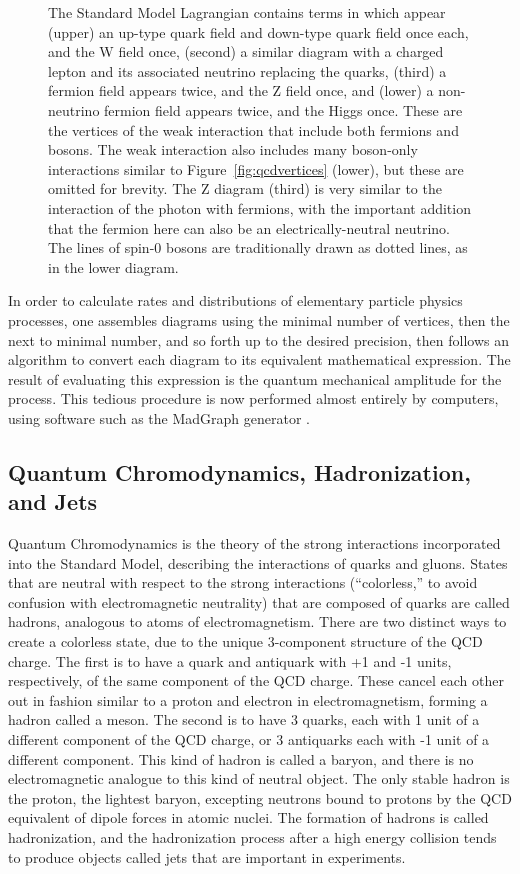 \begin{figure}[h!]
    \caption[The vertices of QCD.]{
      The Standard Model Lagrangian contains terms in which appear (upper) an up-type quark field and down-type quark field once each, and the W field once, (second) a similar diagram with a charged lepton and its associated neutrino replacing the quarks, (third) a fermion field appears twice, and the Z field once, and (lower) a non-neutrino fermion field appears twice, and the Higgs once.
      These are the vertices of the weak interaction that include both fermions and bosons.      
      The weak interaction also includes many boson-only interactions similar to Figure~\ref{fig:qcdvertices} (lower), but these are omitted for brevity.
      The Z diagram (third) is very similar to the interaction of the photon with fermions, with the important addition that the fermion here can also be an electrically-neutral neutrino.
      The lines of spin-0 bosons are traditionally drawn as dotted lines, as in the lower diagram.
    }
    \label{fig:weakvertices}
  \end{figure}  

  In order to calculate rates and distributions of elementary particle physics processes, one assembles diagrams using the minimal number of vertices, then the next to minimal number, and so forth up to the desired precision, then follows an algorithm to convert each diagram to its equivalent mathematical expression.
  The result of evaluating this expression is the quantum mechanical amplitude for the process.
  This tedious procedure is now performed almost entirely by computers, using software such as the MadGraph generator \cite{madgraph}.

  \subsection{Quantum Chromodynamics, Hadronization, and Jets} \label{sec:hadronization}

  Quantum Chromodynamics is the theory of the strong interactions incorporated into the Standard Model, describing the interactions of quarks and gluons.
  States that are neutral with respect to the strong interactions (``colorless,'' to avoid confusion with electromagnetic neutrality) that are composed of quarks are called hadrons, analogous to atoms of electromagnetism.
  There are two distinct ways to create a colorless state, due to the unique 3-component structure of the QCD charge.
  The first is to have a quark and antiquark with +1 and -1 units, respectively, of the same component of the QCD charge.
  These cancel each other out in fashion similar to a proton and electron in electromagnetism, forming a hadron called a meson.
  The second is to have 3 quarks, each with 1 unit of a different component of the QCD charge, or 3 antiquarks each with -1 unit of a different component.
  This kind of hadron is called a baryon, and there is no electromagnetic analogue to this kind of neutral object.
  The only stable hadron is the proton, the lightest baryon, excepting neutrons bound to protons by the QCD equivalent of dipole forces in atomic nuclei.
  The formation of hadrons is called hadronization, and the hadronization process after a high energy collision tends to produce objects called jets that are important in experiments.
  
